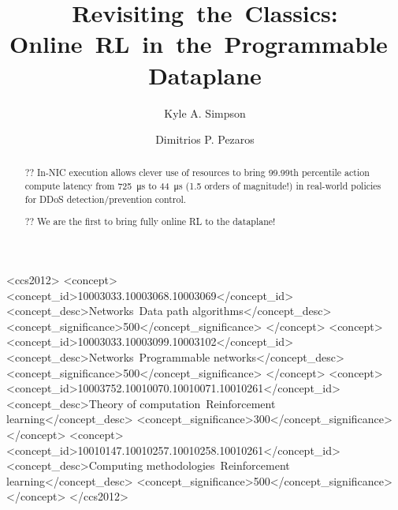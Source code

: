 \documentclass[sigconf,natbib=false]{acmart}
\begin{document}
	\title{Revisiting~the~Classics: Online~RL~in~the~Programmable~Dataplane}
	
	
	 \author{Kyle A. Simpson}
	 \author{Dimitrios P. Pezaros}
	
\renewcommand{\shortauthors}{Simpson \emph{et al}.}
	
\begin{abstract}
?? In-NIC execution allows clever use of resources to bring 99.99th percentile action compute latency  from \SI{725}{\micro\second} to \SI{44}{\micro\second} (1.5 orders of magnitude!) in real-world policies for DDoS detection/prevention control.

?? We are the first to bring fully online RL to the dataplane!
\end{abstract}

\begin{CCSXML}
	<ccs2012>
	<concept>
	<concept_id>10003033.10003068.10003069</concept_id>
	<concept_desc>Networks~Data path algorithms</concept_desc>
	<concept_significance>500</concept_significance>
	</concept>
	<concept>
	<concept_id>10003033.10003099.10003102</concept_id>
	<concept_desc>Networks~Programmable networks</concept_desc>
	<concept_significance>500</concept_significance>
	</concept>
	<concept>
	<concept_id>10003752.10010070.10010071.10010261</concept_id>
	<concept_desc>Theory of computation~Reinforcement learning</concept_desc>
	<concept_significance>300</concept_significance>
	</concept>
	<concept>
	<concept_id>10010147.10010257.10010258.10010261</concept_id>
	<concept_desc>Computing methodologies~Reinforcement learning</concept_desc>
	<concept_significance>500</concept_significance>
	</concept>
	</ccs2012>
\end{CCSXML}


	
\end{document}
